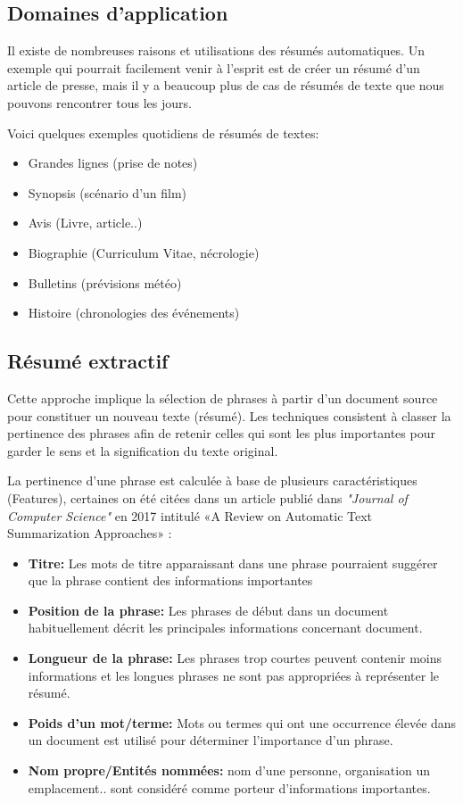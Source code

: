     \subsection{Domaines d'application}    
    Il existe de nombreuses raisons et utilisations des résumés automatiques. Un exemple qui pourrait facilement venir à l'esprit est de créer un résumé d'un article de presse, mais il y a beaucoup plus de cas de résumés de texte que nous pouvons rencontrer tous les jours.

    Voici quelques exemples quotidiens de résumés de textes:
    \begin{itemize}
        \item Grandes lignes (prise de notes)
        \item Synopsis (scénario d'un film)
        \item Avis (Livre, article..)
        \item Biographie (Curriculum Vitae, nécrologie)
        \item Bulletins (prévisions météo)
        \item Histoire (chronologies des événements)
    \end{itemize}

    \subsection{Résumé extractif}
        Cette approche implique la sélection de phrases à partir d'un document source pour constituer un nouveau texte (résumé). Les techniques consistent à classer la pertinence des phrases afin de retenir celles qui sont les plus importantes pour garder le sens et la signification du texte original.

        La pertinence d'une phrase est calculée à base de plusieurs caractéristiques (Features), certaines on été citées dans un article publié dans \emph{"Journal of Computer Science"} en 2017 intitulé «A Review on Automatic Text Summarization Approaches»\cite{ratsa} :
        
        \begin{itemize}
            \item \textbf{Titre:} Les mots de titre apparaissant dans une phrase pourraient suggérer que la phrase contient des informations importantes
            \item \textbf{Position de la phrase:} Les phrases de début dans un document habituellement décrit les principales informations concernant document.
            \item \textbf{Longueur de la phrase:} Les phrases trop courtes peuvent contenir moins informations et les longues phrases ne sont pas appropriées à représenter le résumé.
            \item \textbf{Poids d'un mot/terme:} Mots ou termes qui ont une occurrence élevée dans un document est utilisé pour déterminer l'importance d'un phrase.
            \item \textbf{Nom propre/Entités nommées:} nom d'une personne, organisation un emplacement.. sont considéré comme porteur d'informations importantes.
        \end{itemize}   


